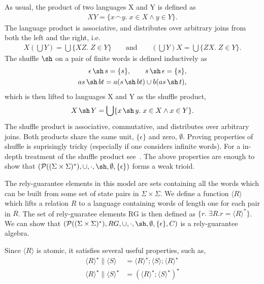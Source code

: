 \documentclass{llncs}
\DeclareMathOperator{\sha}{\sh}
\begin{document}
As usual, the product of two languages X and Y is defined as
\begin{align*}
XY = \{x\frown y.\; x \in X \land y \in Y\}.
\end{align*}
The language product is associative, and distributes over arbitrary
joins from both the left and the right, i.e.
\begin{align*}
X(\bigcup Y) = \bigcup\{XZ.\; Z \in Y\} \qquad \text{and} \qquad (\bigcup Y)X = \bigcup\{ZX.\; Z \in Y\}.
\end{align*}
The shuffle $\sha$ on a pair
of finite words is defined inductively as
\begin{align*}
\epsilon \sha s = \{s\}, \qquad s \sha \epsilon = \{s\},\\
as \sha bt = a(s \sha bt) \cup b(as \sha t),
\end{align*}
which is then lifted to languages X and Y as the shuffle product,
\begin{align*}
X \sha Y = \bigcup\{x \sha y.\; x \in X \land x \in Y\}.
\end{align*}
The shuffle product is associative, commutative, and distributes over
arbitrary joins. Both products share the same unit, $\{\epsilon\}$ and
zero, $\emptyset$. Proving properties of shuffle is suprisingly
tricky (especially if one considers infinite words). For a in-depth
treatment of the shuffle product see~\cite{shufflethings}. The
above properties are enough to show that $(\mathcal{P}((\Sigma\times\Sigma)^*),
\cup, \cdot,\sha, \emptyset, \{\epsilon\})$ forms a weak trioid.

The rely-guarantee elements in this model are sets containing all the
words which can be built from some set of state pairs in
$\Sigma\times\Sigma$. We define a function $\langle R\rangle$ which
lifts a relation $R$ to a language containing words of length one for
each pair in $R$. The set of rely-guaratee elements RG is then defined
as $\{r.\; \exists R. r = \langle R\rangle^*\}$. We can show that
$(\mathcal{P}((\Sigma\times\Sigma)^*), RG, \cup, \cdot,\sha,
\emptyset, \{\epsilon\}, C)$ is a rely-guarantee algebra.

Since $\langle R\rangle$ is atomic, it satisfies several useful properties, such as,
\begin{align*}
\langle R\rangle^\star \| \langle S\rangle &= \langle R\rangle^\star; \langle S\rangle; \langle R\rangle^\star\\
\langle R\rangle^\star \| \langle S\rangle^\star &= (\langle R\rangle^\star; \langle S\rangle^\star)^\star
\end{align*}
\end{document}
